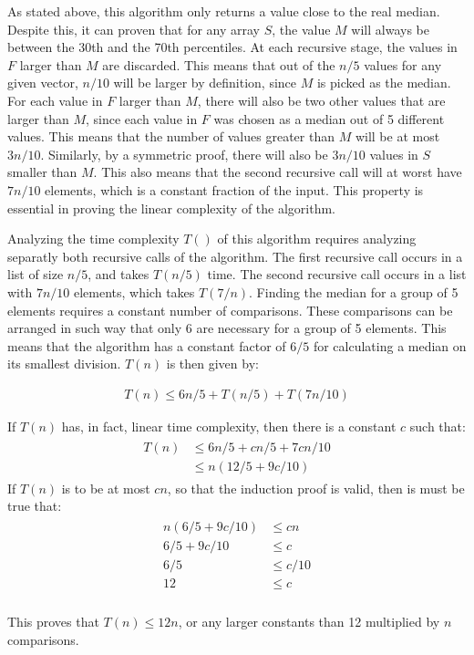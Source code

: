 As stated above, this algorithm only returns a value close to the real median. Despite this, it can proven that for any array $S$, the value $M$ will always be between the 30th and the 70th percentiles. At each recursive stage, the values in $F$ larger than $M$ are discarded. This means that out of the $n/5$ values for any given vector, $n/10$ will be larger by definition, since $M$ is picked as the median. For each value in $F$ larger than $M$, there will also be two other values that are larger than $M$, since each value in $F$ was chosen as a median out of 5 different values. This means that the number of values greater than $M$ will be at most $3n/10$. Similarly, by a symmetric proof, there will also be $3n/10$ values in $S$ smaller than $M$. This also means that the second recursive call will at worst have $7n/10$ elements, which is a constant fraction of the input. This property is essential in proving the linear complexity of the algorithm.

Analyzing the time complexity $T()$ of this algorithm requires analyzing separatly both recursive calls of the algorithm. The first recursive call occurs in a list of size $n/5$, and takes $T(n/5)$ time. The second recursive call occurs in a list with $7n/10$ elements, which takes $T(7/n)$. Finding the median for a group of 5 elements requires a constant number of comparisons. These comparisons can be arranged in such way that only 6 are necessary for a group of 5 elements. This means that the algorithm has a constant factor of $6/5$ for calculating a median on its smallest division. $T(n)$ is then given by:

\begin{align}
T(n) \le 6n/5 + T(n/5) + T(7n/10)
\end{align}

If $T(n)$ has, in fact, linear time complexity, then there is a constant $c$ such that:
\begin{align}
\begin{aligned}
T(n) & \le 6n/5 + cn/5 + 7cn/10\\
     & \le n(12/5 + 9c/10)
\end{aligned}
\end{align}
If $T(n)$ is to be at most $cn$, so that the induction proof is valid, then is must be true that:
\begin{align}
\begin{aligned}
    n (6/5 + 9c/10) & \le cn \\
        6/5 + 9c/10 & \le c \\
                6/5 & \le c/10 \\
                 12 & \le c \\
\end{aligned}
\end{align}

This proves that $T(n) \le 12n$, or any larger constants than 12 multiplied by $n$ comparisons.

